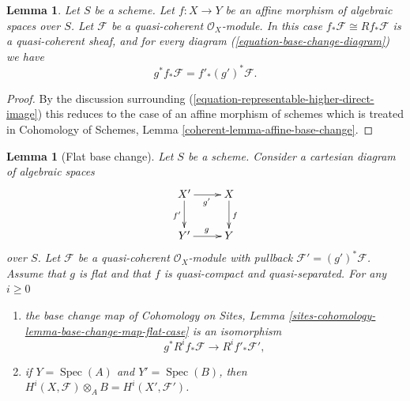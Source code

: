 \documentclass{stacks-project}
\theoremstyle{plain}
\newtheorem{lemma}[subsection]{Lemma}
\theoremstyle{definition}
\theoremstyle{remark}
\numberwithin{equation}{subsection}
\def\Spec{\mathop{\mathrm{Spec}}}
\begin{document}
\begin{lemma}
\label{lemma-affine-base-change}
Let $S$ be a scheme. Let $f : X \to Y$ be an affine morphism of algebraic
spaces over $S$. Let $\mathcal{F}$ be a quasi-coherent $\mathcal{O}_X$-module.
In this case $f_*\mathcal{F} \cong Rf_*\mathcal{F}$ is a quasi-coherent
sheaf, and for every diagram (\ref{equation-base-change-diagram})
we have
$$
g^*f_*\mathcal{F} = f'_*(g')^*\mathcal{F}.
$$
\end{lemma}

\begin{proof}
By the discussion surrounding
(\ref{equation-representable-higher-direct-image})
this reduces to the case of an affine morphism of schemes which
is treated in Cohomology of Schemes, Lemma
\ref{coherent-lemma-affine-base-change}.
\end{proof}

\begin{lemma}[Flat base change]
\label{lemma-flat-base-change-cohomology}
Let $S$ be a scheme. Consider a cartesian diagram of algebraic spaces
$$
\xymatrix{
X' \ar[d]_{f'} \ar[r]_{g'} & X \ar[d]^f \\
Y' \ar[r]^g & Y
}
$$
over $S$.
Let $\mathcal{F}$ be a quasi-coherent $\mathcal{O}_X$-module
with pullback $\mathcal{F}' = (g')^*\mathcal{F}$.
Assume that $g$ is flat and that $f$ is quasi-compact and quasi-separated.
For any $i \geq 0$
\begin{enumerate}
\item the base change map of
Cohomology on Sites, Lemma
\ref{sites-cohomology-lemma-base-change-map-flat-case}
is an isomorphism
$$
g^*R^if_*\mathcal{F} \longrightarrow R^if'_*\mathcal{F}',
$$
\item if $Y = \Spec(A)$ and $Y' = \Spec(B)$, then
$H^i(X, \mathcal{F}) \otimes_A B = H^i(X', \mathcal{F}')$.
\end{enumerate}
\end{lemma}
\end{document}
